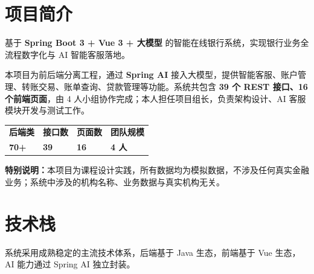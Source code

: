 \documentclass[11pt,a4paper,openany]{ctexrep}
\begin{document}
\chapter{项目简介}

\begin{infobox}[一句话定位]
基于 \textbf{Spring Boot 3 + Vue 3 + 大模型} 的智能在线银行系统，实现银行业务全流程数字化与 AI 智能客服落地。
\end{infobox}

本项目为前后端分离工程，通过 \textbf{Spring AI} 接入大模型，提供智能客服、账户管理、转账交易、账单查询、贷款管理等功能。系统共包含 \textbf{39 个 REST 接口、16 个前端页面}，由 4 人小组协作完成；本人担任项目组长，负责架构设计、AI 客服模块开发与测试工作。

\begin{center}
\renewcommand{\arraystretch}{1.5}
\begin{tabular}{>{\centering\arraybackslash}p{3cm} >{\centering\arraybackslash}p{3cm}
>{\centering\arraybackslash}p{3cm} >{\centering\arraybackslash}p{3cm}}
\rowcolor{table_head}\color{white}\textbf{后端类} & \color{white}\textbf{接口数} &
\color{white}\textbf{页面数} & \color{white}\textbf{团队规模}\\
\textbf{70+} & \textbf{39} & \textbf{16} & \textbf{4 人}\\
\end{tabular}
\end{center}

\begin{warnbox}
\textbf{特别说明：}本项目为课程设计实践，所有数据均为模拟数据，不涉及任何真实金融业务；系统中涉及的机构名称、业务数据与真实机构无关。
\end{warnbox}

\chapter{技术栈}

系统采用成熟稳定的主流技术体系，后端基于 Java 生态，前端基于 Vue 生态，AI 能力通过 Spring AI 独立封装。
\end{document}
